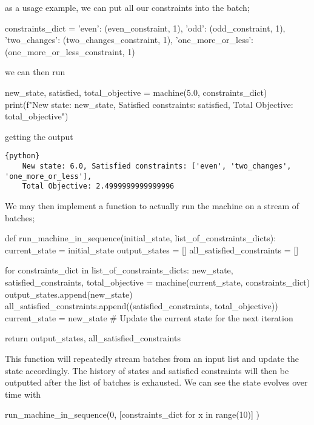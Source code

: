 as a usage example, we can put all our constraints into the batch;

\begin{betterpython}
    constraints_dict = {
        'even': (even_constraint, 1),
        'odd': (odd_constraint, 1),
        'two_changes': (two_changes_constraint, 1),
        'one_more_or_less': (one_more_or_less_constraint, 1)
    }
\end{betterpython}

we can then run

\begin{betterpython}
    new_state, satisfied, total_objective = machine(5.0, constraints_dict)
    print(f"New state: {new_state}, Satisfied constraints: {satisfied}, Total Objective: {total_objective}")
\end{betterpython}

getting the output

\begin{lstlisting}{python}
    New state: 6.0, Satisfied constraints: ['even', 'two_changes', 'one_more_or_less'],
    Total Objective: 2.4999999999999996
\end{lstlisting}

We may then implement a function to actually run the machine on a stream of batches;

\begin{betterpython}
    def run_machine_in_sequence(initial_state, list_of_constraints_dicts):
        current_state = initial_state
        output_states = []
        all_satisfied_constraints = []
    
        for constraints_dict in list_of_constraints_dicts:
            new_state, satisfied_constraints, total_objective = machine(current_state, constraints_dict)
            output_states.append(new_state)
            all_satisfied_constraints.append((satisfied_constraints, total_objective))
            current_state = new_state  # Update the current state for the next iteration
    
        return output_states, all_satisfied_constraints
\end{betterpython}

This function will repeatedly stream batches from an input list and update the state accordingly. The history of states and satisfied constraints will then be outputted after the list of batches is exhausted. We can see the state evolves over time with

\begin{betterpython}
    run_machine_in_sequence(0, [constraints_dict for x in range(10)] )
\end{betterpython}

